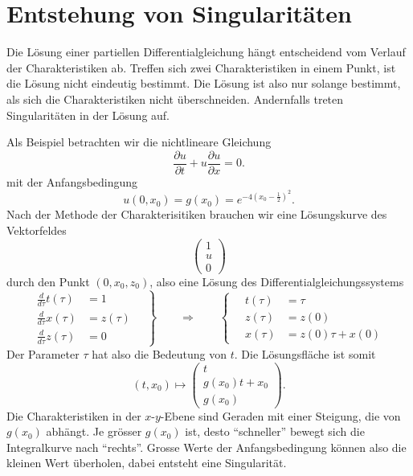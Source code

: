%
%
%
\section{Entstehung von Singularitäten}
Die Lösung einer partiellen Differentialgleichung hängt entscheidend
vom Verlauf der Charakteristiken ab. Treffen sich zwei Charakteristiken
in einem Punkt, ist die Lösung nicht eindeutig bestimmt. Die Lösung
ist also nur solange bestimmt, als sich die Charakteristiken nicht überschneiden.
Andernfalls treten Singularitäten in der Lösung auf.

Als Beispiel betrachten wir die nichtlineare Gleichung 
\begin{equation}
\frac{\partial u}{\partial t}+u\frac{\partial u}{\partial x}=0.
\label{wellenichtlinear}
\end{equation}
mit der Anfangsbedingung 
\[
u(0,x_0)=g(x_0)=e^{-4(x_0-\frac12)^2}.
\]
Nach der Methode der Charakterisitiken brauchen wir eine Lösungskurve
des Vektorfeldes
\[
\begin{pmatrix}
1\\
u\\
0
\end{pmatrix}
\]
durch den Punkt $(0,x_0, z_0)$, also eine Lösung des Differentialgleichungssystems
\[
\left.
\begin{aligned}
\frac{d}{d\tau} t(\tau)&=1\\
\frac{d}{d\tau} x(\tau)&=z(\tau)\\
\frac{d}{d\tau} z(\tau)&=0
\end{aligned}
\quad
\right\}
\qquad
\Rightarrow
\qquad
\left\{
\quad
\begin{aligned}
t(\tau)&=\tau\\
z(\tau)&=z(0)\\
x(\tau)&=z(0)\tau +x(0)
\end{aligned}
\right.
\]
Der Parameter $\tau$ hat also die Bedeutung von $t$.
Die Lösungsfläche ist somit
\[
(t,x_0)\mapsto
\begin{pmatrix}
t\\
g(x_0)t+x_0\\
g(x_0)
\end{pmatrix}.
\]
Die Charakteristiken in der $x$-$y$-Ebene sind Geraden mit einer
Steigung, die von $g(x_0)$ abhängt. Je grösser $g(x_0)$ ist, desto
``schneller'' bewegt sich die Integralkurve nach ``rechts''. Grosse
Werte der Anfangsbedingung können also die kleinen Wert überholen,
dabei entsteht eine Singularität.

